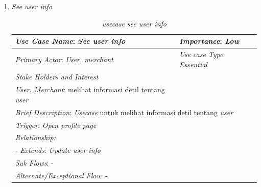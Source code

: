 \documentclass[a4paper]{article}
\begin{document}
\begin{enumerate}
\begin{enumerate}
        \newpage
        \item \textit{See user info}
        \begin{table}[h]
            \centering
            \begin{tabular}{|lll}
            \hline
            \multicolumn{1}{|l|}{\textit{Use Case Name}: \textit{See user info}}             & \multicolumn{2}{l|}{\textit{Importance}: \textit{Low}}   \\ \hline
            \multicolumn{1}{|l|}{\textit{Primary Actor}: \textit{User, merchant}}             & \multicolumn{2}{l|}{\textit{Use case Type}: \textit{Essential}} \\ \hline
            \multicolumn{1}{|l|}{\textit{Stake Holders and Interest}} &                               &                               \\ \cline{1-1}
            \multicolumn{1}{|l|}{\textit{User, Merchant}: melihat informasi detil tentang \textit{user}}                                                     &                               &                               \\ \hline
            \multicolumn{3}{|l|}{\textit{Brief Description}: \textit{Usecase} untuk melihat informasi detil tentang \textit{user}}                                                                         \\ \hline
            \multicolumn{3}{|l|}{\textit{Trigger}: \textit{Open profile page}}                                                                                   \\ \hline
            \multicolumn{3}{|l|}{\textit{Relationship:}}                                                                              \\ \hline
            \multicolumn{3}{|l|}{- \textit{Extends}: \textit{Update user info}}                                                                                                                     \\ \hline
            \multicolumn{3}{|l|}{\textit{Sub Flows}: -}                                                                                 \\ \hline
            \multicolumn{3}{|l|}{\textit{Alternate/Exceptional Flow}: -}                                                                \\ \hline
            \end{tabular}
            \caption{\textit{usecase see user info} }
        \end{table}



\end{enumerate}
\end{enumerate}
\end{document}
